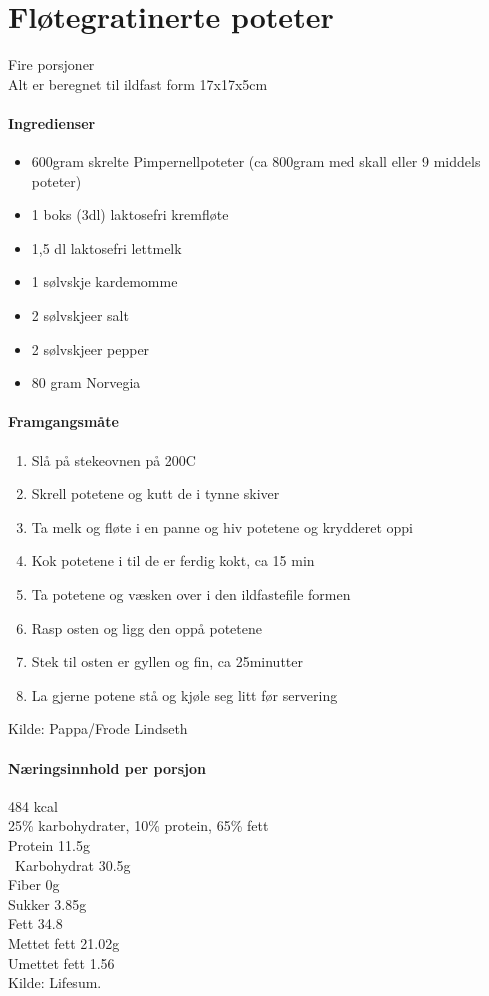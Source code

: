 \section{﻿Fløtegratinerte poteter}
\label{flotegratinerte}
Fire porsjoner\\
Alt er beregnet til ildfast form 17x17x5cm

\paragraph{Ingredienser}
\begin{itemize}[noitemsep]
	\item 600gram skrelte Pimpernellpoteter (ca 800gram med skall eller 9 middels poteter)
	\item	1 boks (3dl) laktosefri kremfløte
	\item 1,5 dl laktosefri lettmelk
	\item 1 sølvskje kardemomme
	\item 2 sølvskjeer salt
	\item 2 sølvskjeer pepper
	\item 80 gram Norvegia
\end{itemize}

\paragraph{Framgangsmåte}
\begin{enumerate}[noitemsep]
	\item Slå på stekeovnen på 200\degree C
	\item Skrell potetene og kutt de i tynne skiver
	\item Ta melk og fløte i en panne og hiv potetene og krydderet oppi
	\item Kok potetene i til de er ferdig kokt, ca 15 min
	\item Ta potetene og væsken over i den ildfastefile formen
	\item Rasp osten og ligg den oppå potetene
	\item Stek til osten er gyllen og fin, ca 25minutter
	\item La gjerne potene stå og kjøle seg litt før servering
\end{enumerate}

Kilde: Pappa/Frode Lindseth\\


\paragraph{Næringsinnhold per porsjon}
484 kcal\\
25\% karbohydrater, 10\% protein, 65\% fett\\
Protein 11.5g\\\
Karbohydrat 30.5g\\
Fiber 0g\\
Sukker 3.85g\\
Fett 34.8\\
Mettet fett 21.02g\\
Umettet fett 1.56\\
Kilde: Lifesum.
